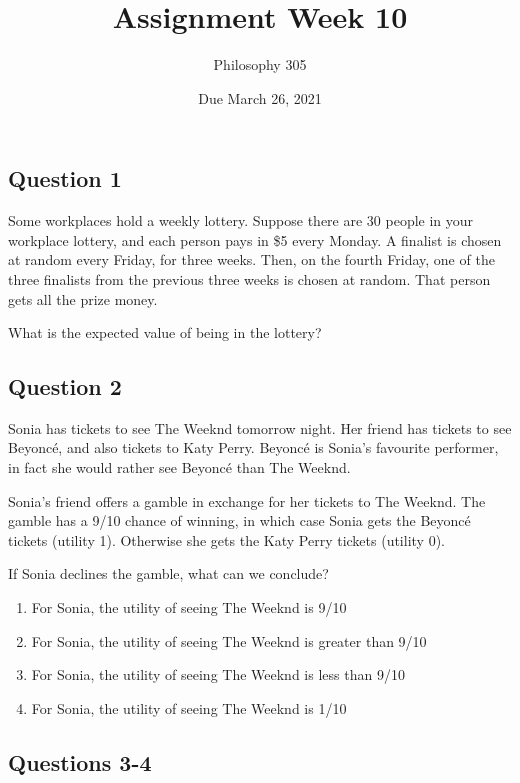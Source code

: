 \documentclass[
  11pt,
]{article}
\title{Assignment Week 10}
\author{Philosophy 305}
\date{Due March 26, 2021}
\providecommand{\tightlist}{%
  \setlength{\itemsep}{0pt}\setlength{\parskip}{0pt}}
\begin{document}
\maketitle

\hypertarget{question-1}{%
\subsection{Question 1}\label{question-1}}

Some workplaces hold a weekly lottery. Suppose there are 30 people in
your workplace lottery, and each person pays in \$5 every Monday. A
finalist is chosen at random every Friday, for three weeks. Then, on the
fourth Friday, one of the three finalists from the previous three weeks
is chosen at random. That person gets all the prize money.

What is the expected value of being in the lottery?

\hypertarget{question-2}{%
\subsection{Question 2}\label{question-2}}

Sonia has tickets to see The Weeknd tomorrow night. Her friend has
tickets to see Beyoncé, and also tickets to Katy Perry. Beyoncé is
Sonia's favourite performer, in fact she would rather see Beyoncé than
The Weeknd.

Sonia's friend offers a gamble in exchange for her tickets to The
Weeknd. The gamble has a 9/10 chance of winning, in which case Sonia
gets the Beyoncé tickets (utility 1). Otherwise she gets the Katy Perry
tickets (utility 0).

If Sonia declines the gamble, what can we conclude?

\begin{enumerate}
\def\labelenumi{\alph{enumi}.}
\tightlist
\item
  For Sonia, the utility of seeing The Weeknd is 9/10
\item
  For Sonia, the utility of seeing The Weeknd is greater than 9/10
\item
  For Sonia, the utility of seeing The Weeknd is less than 9/10
\item
  For Sonia, the utility of seeing The Weeknd is 1/10
\end{enumerate}

\hypertarget{questions-3-4}{%
\subsection{Questions 3-4}\label{questions-3-4}}
\end{document}
